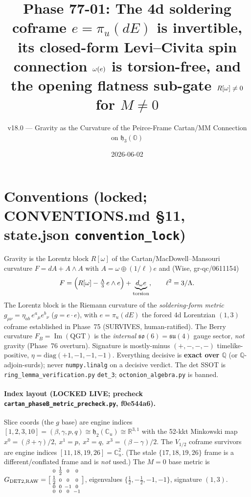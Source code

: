 \documentclass[11pt]{article}
\title{Phase 77-01: The 4d soldering coframe $e=\pi_u(dE)$ is invertible,
its closed-form Levi--Civita spin connection $\om(e)$ is torsion-free,
and the opening flatness sub-gate $R[\om]\neq0$ for $M\neq0$}
\author{v18.0 --- Gravity as the Curvature of the Peirce-Frame Cartan/MM Connection on $\mathfrak{h}_3(\mathbb{O})$}
\date{2026-06-02}
\newcommand{\R}{\mathbb{R}}
\newcommand{\Q}{\mathbb{Q}}
\newcommand{\half}{\tfrac12}
\newcommand{\eu}{e}
\newcommand{\om}{\omega}
\theoremstyle{definition}\newtheorem{remark}{Remark}
\theoremstyle{plain}\newtheorem{proposition}{Proposition}
\begin{document}
\maketitle

\section*{Conventions (locked; CONVENTIONS.md \S11, state.json \texttt{convention\_lock})}
Gravity is the Lorentz block $R[\om]$ of the Cartan/MacDowell--Mansouri curvature
$F=dA+A\wedge A$ with $A=\om\oplus(1/\ell)\eu$ and (Wise, gr-qc/0611154)
\begin{equation}\label{eq:wise}
  F=\Bigl(R[\om]-\tfrac{\Lambda}{3}\,\eu\wedge \eu\Bigr)+\underbrace{d_\om \eu}_{\text{torsion}},
  \qquad \ell^2=3/\Lambda .
\end{equation}
The Lorentz block is the Riemann curvature of the \emph{soldering-form metric}
$g_{\mu\nu}=\eta_{ab}\,\eu^a{}_\mu \eu^b{}_\nu$ ($g=\eu\cdot\eu$), with
$\eu=\pi_u(dE)$ the forced 4d Lorentzian $(1,3)$ coframe established in Phase~75
(SURVIVES, human-ratified). The Berry curvature $F_B=\operatorname{Im}(\mathrm{QGT})$ is
the \emph{internal} $\mathfrak{so}(6)=\mathfrak{su}(4)$ gauge sector, \emph{not} gravity
(Phase~76 overturn). Signature is mostly-minus $(+,-,-,-)$ timelike-positive,
$\eta=\mathrm{diag}(+1,-1,-1,-1)$. Everything decisive is \textbf{exact over $\Q$}
(or $\Q$-adjoin-surds); never \texttt{numpy.linalg} on a decisive verdict. The det SSOT is
\texttt{ring\_lemma\_verification.py} \texttt{det\_3}; \texttt{octonion\_algebra.py} is banned.

\paragraph{Index layout (LOCKED LIVE; precheck \texttt{cartan\_phaseB\_metric\_precheck.py}, f0e544a6).}
Slice coords (the $g$ base) are engine indices $[1,2,3,10]=(\beta,\gamma,p,q)\cong\mathfrak{h}_2(\mathbb{C}_u)\cong\R^{3,1}$
with the 52-kkt Minkowski map $x^0=(\beta+\gamma)/2,\ x^1=p,\ x^2=q,\ x^3=(\beta-\gamma)/2$.
The $V_{1/2}$ coframe survivors are engine indices $[11,18,19,26]=\mathbb{C}_u^2$.
(The stale $\{17,18,19,26\}$ frame is a different/conflated frame and is \emph{not} used.)
The $M=0$ base metric is
$G_{\rm DET2,RAW}=\bigl[\begin{smallmatrix}0&\half&0&0\\ \half&0&0&0\\ 0&0&-1&0\\ 0&0&0&-1\end{smallmatrix}\bigr]$,
eigenvalues $\{\half,-\half,-1,-1\}$, signature $(1,3)$.
\end{document}
